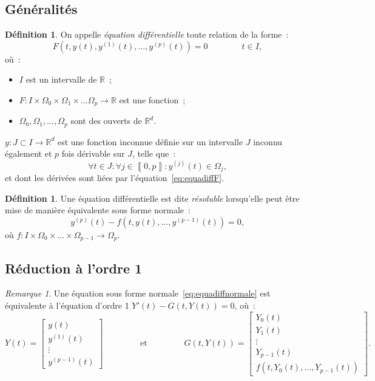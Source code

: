 \documentclass{report}
\theoremstyle{definition}
\newtheorem{déf}[thm]{Définition}
\theoremstyle{remark}
\newtheorem*{rmq}{Remarque}
\numberwithin{equation}{section}
\newcommand{\R}{\mathbb R}
\newcommand{\intint}[2]{\left\llbracket#1, #2\right\rrbracket}
\begin{document}
		\subsection{Généralités}
			\begin{déf} On appelle \textit{équation différentielle} toute relation de la forme~:
			\begin{equation}\label{eq:equadiffF}
				F(t, y(t), y^{(1)}(t), \ldots, y^{(p)}(t)) = 0\qquad\qquad t \in I,
			\end{equation}
			où~:
			\begin{itemize}
				\item $I$ est un intervalle de $\R$~;
				\item $F : I \times \Omega_0 \times \Omega_1 \times \ldots \Omega_p \to \R$ est une fonction~;
				\item $\Omega_0, \Omega_1, \ldots, \Omega_p$ sont des ouverts de $\R^d$.
			\end{itemize}
			$y : J \subset I \to \R^d$ est une fonction inconnue définie sur un intervalle $J$ inconnu également et $p$ fois dérivable sur $J$, telle que~:
			\begin{equation}
				\forall t \in J : \forall j \in \intint 0p : y^{(j)}(t) \in \Omega_j,
			\end{equation}
			et dont les dérivées sont liées par l'équation~\eqref{eq:equadiffF}.
			\end{déf}

			\begin{déf} Une équation différentielle est dite \textit{résoluble} lorsqu'elle peut être mise de manière équivalente sous forme normale~:
			\begin{equation}\label{eq:equadiffnormale}
				y^{(p)}(t) - f(t, y(t), \ldots, y^{(p-1)}(t)) = 0,
			\end{equation}
			où $f : I \times \Omega_0 \times \ldots \times \Omega_{p-1} \to \Omega_p$.
			\end{déf}

		\subsection{Réduction à l'ordre 1}
			\begin{rmq} Une équation sous forme normale~\eqref{eq:equadiffnormale} est équivalente à l'équation d'ordre 1 $Y'(t) - G(t, Y(t)) = 0$, où~:
			\begin{equation}
				Y(t) = \begin{bmatrix}y(t) \\y^{(1)}(t) \\ \vdots \\ y^{(p-1)}(t)\end{bmatrix} \qquad\qquad \text{ et } \qquad\qquad
			G(t, Y(t)) = \begin{bmatrix}Y_0(t) \\ Y_1(t) \\ \vdots \\ Y_{p-1}(t) \\ f(t, Y_0(t), \ldots, Y_{p-1}(t))\end{bmatrix}.
			\end{equation}
			\end{rmq}
\end{document}

